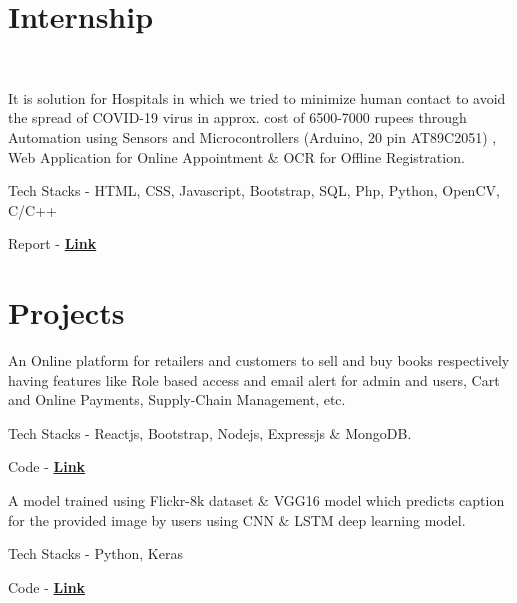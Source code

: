 \documentclass[]{deedy-resume-openfont}
\begin{document}
\begin{minipage}[t]{0.66\textwidth} 





\section{Internship}
\\
\vspace{\topsep}
\begin{tightemize}
\item It is solution for Hospitals in which we tried to minimize human contact to avoid the spread of COVID-19 virus in approx. cost of 6500-7000 rupees through Automation using Sensors and Microcontrollers (Arduino, 20 pin AT89C2051) , Web Application for Online Appointment \& OCR for Offline Registration. 
\item Tech Stacks - HTML, CSS, Javascript, Bootstrap, SQL, Php, Python, OpenCV, C/C++
\item Report - \href{https://github.com/PSoni8/Seimens-Project}{\bf Link}
\end{tightemize}

\sectionsep

\section{Projects}

\location{}
\begin{tightemize}
\item An Online platform for retailers and customers to sell and buy books respectively having features like Role based access and email alert for admin and users, Cart and Online Payments, Supply-Chain Management, etc.
\item Tech Stacks - Reactjs, Bootstrap, Nodejs, Expressjs \& MongoDB.
\item Code - \href{https://github.com/PSoni8/Bookcentre}{\bf Link}
\end{tightemize}
\sectionsep

\location{}
\begin{tightemize}
\item A model trained using Flickr-8k dataset \& VGG16 model which predicts caption for the provided image by users using CNN \& LSTM deep learning model.
\item Tech Stacks - Python, Keras
\item Code - \href{https://github.com/PSoni8/Find-my-Caption}{\bf  Link}
\end{tightemize}
\sectionsep


\end{minipage}
\end{document}
